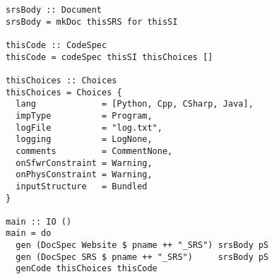 \begin{tcolorbox}[breakable, toprule at break=0pt, bottomrule at break=0pt]
\begin{verbatim}
srsBody :: Document
srsBody = mkDoc thisSRS for thisSI

thisCode :: CodeSpec
thisCode = codeSpec thisSI thisChoices []

thisChoices :: Choices
thisChoices = Choices {
  lang             = [Python, Cpp, CSharp, Java],
  impType          = Program,
  logFile          = "log.txt",
  logging          = LogNone,
  comments         = CommentNone,
  onSfwrConstraint = Warning,
  onPhysConstraint = Warning,
  inputStructure   = Bundled
}

main :: IO ()
main = do
  gen (DocSpec Website $ pname ++ "_SRS") srsBody pS
  gen (DocSpec SRS $ pname ++ "_SRS")     srsBody pS
  genCode thisChoices thisCode
\end{verbatim}
\end{tcolorbox}
